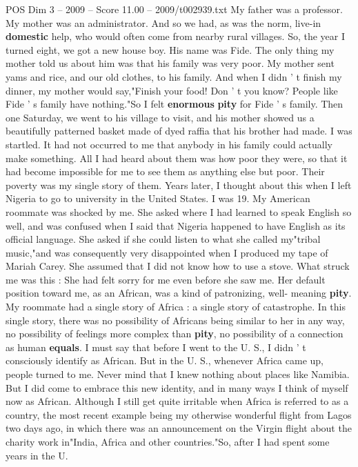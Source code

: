 \begin{textsample}{POS Dim 3 – 2009 – Score 11.00 – 2009/t002939.txt}
My father was a professor.
My mother was an administrator.
And so we had, as was the norm, live-in \textbf{domestic} help, who would often come from nearby rural villages.
So, the year I turned eight, we got a new house boy.
His name was Fide.
The only thing my mother told us about him was that his family was very poor.
My mother sent yams and rice, and our old clothes, to his family.
And when I didn ' t finish my dinner, my mother would say,"Finish your food!
Don ' t you know?
People like Fide ' s family have nothing."So I felt \textbf{enormous} \textbf{pity} for Fide ' s family.
Then one Saturday, we went to his village to visit, and his mother showed us a beautifully patterned basket made of dyed raffia that his brother had made.
I was startled.
It had not occurred to me that anybody in his family could actually make something.
All I had heard about them was how poor they were, so that it had become impossible for me to see them as anything else but poor.
Their poverty was my single story of them.
Years later, I thought about this when I left Nigeria to go to university in the United States.
I was 19.
My American roommate was shocked by me.
She asked where I had learned to speak English so well, and was confused when I said that Nigeria happened to have English as its official language.
She asked if she could listen to what she called my"tribal music,"and was consequently very disappointed when I produced my tape of Mariah Carey.
She assumed that I did not know how to use a stove.
What struck me was this : She had felt sorry for me even before she saw me.
Her default position toward me, as an African, was a kind of patronizing, well- meaning \textbf{pity}.
My roommate had a single story of Africa : a single story of catastrophe.
In this single story, there was no possibility of Africans being similar to her in any way, no possibility of feelings more complex than \textbf{pity}, no possibility of a connection as human \textbf{equals}.
I must say that before I went to the U.
S., I didn ' t consciously identify as African.
But in the U.
S., whenever Africa came up, people turned to me.
Never mind that I knew nothing about places like Namibia.
But I did come to embrace this new identity, and in many ways I think of myself now as African.
Although I still get quite irritable when Africa is referred to as a country, the most recent example being my otherwise wonderful flight from Lagos two days ago, in which there was an announcement on the Virgin flight about the charity work in"India, Africa and other countries."So, after I had spent some years in the U.

\end{textsample}
